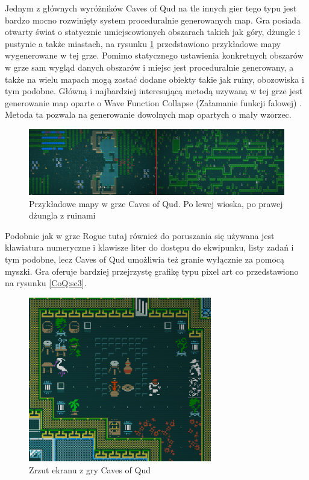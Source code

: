 \documentclass[12pt,twoside]{article}
\begin{document}
Jednym z głównych wyróżników Caves of Qud na tle innych gier tego typu jest bardzo mocno rozwinięty system proceduralnie generowanych map. Gra posiada otwarty świat o statycznie umiejscowionych obszarach takich jak góry, dżungle i pustynie a także miastach, na rysunku \ref{CoQ:scr1} przedstawiono przykładowe mapy wygenerowane w tej grze. Pomimo statycznego ustawienia konkretnych obszarów w grze sam wygląd danych obszarów i miejsc jest proceduralnie generowany, a także na wielu mapach mogą zostać dodane obiekty takie jak ruiny, obozowiska i tym podobne. Główną i najbardziej interesującą metodą uzywaną w tej grze jest generowanie map oparte o Wave Function Collapse (Załamanie funkcji falowej) \cite{coq_wfc}. Metoda ta pozwala na generowanie dowolnych map opartych o mały wzorzec.

\FloatBarrier
\begin{figure}[h]
	\centering
	\includegraphics[width=16cm]{images/caves_of_qud/scr1.png}
	\caption{Przykładowe mapy w grze Caves of Qud. Po lewej wioska, po prawej dżungla z ruinami}
	\label{CoQ:scr1}
\end{figure}
\FloatBarrier

Podobnie jak w grze Rogue tutaj również do poruszania się używana jest klawiatura numeryczne i klawisze liter do dostępu do ekwipunku, listy zadań i tym podobne, lecz Caves of Qud umożliwia też granie wyłącznie za pomocą myszki. Gra oferuje bardziej przejrzystę grafikę typu pixel art co przedstawiono na rysunku \ref{CoQ:sc3}.

\FloatBarrier
\begin{figure}[h]
	\centering
	\includegraphics[width=8cm]{images/caves_of_qud/scr3.png}
	\caption{Zrzut ekranu z gry Caves of Qud}
	\label{CoQ:scr3}
\end{figure}
\FloatBarrier
\end{document}
